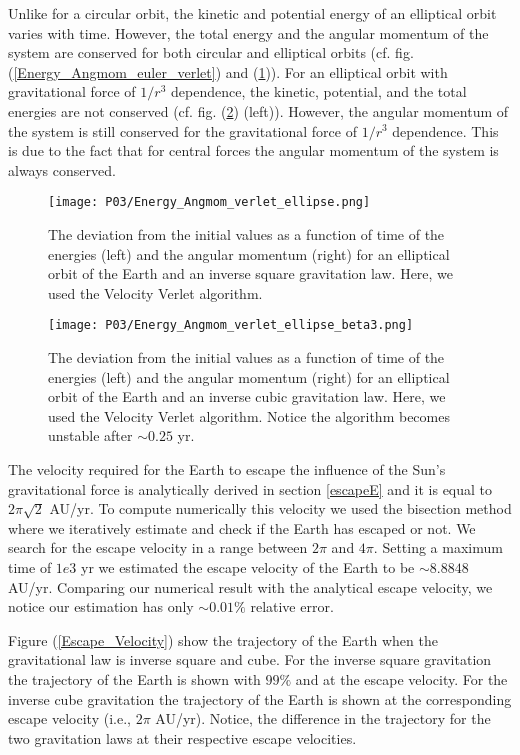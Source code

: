 \documentclass[a4paper]{article}
\begin{document}
Unlike for a circular orbit, the kinetic and potential energy of an elliptical orbit varies with time. However, the total energy and the angular momentum of the system are conserved for both circular and elliptical orbits (cf. fig. (\ref{Energy_Angmom_euler_verlet}) and (\ref{Energy_Angmom_verlet_ellipse})). For an elliptical orbit with gravitational force of $1/r^{3}$ dependence, the kinetic, potential, and the total energies are not conserved (cf. fig. (\ref{Energy_Angmom_verlet_ellipse_beta3}) (left)). However, the angular momentum of the system is still conserved for the gravitational force of $1/r^{3}$ dependence. This is due to the fact that for central forces the angular momentum of the system is always conserved.

\begin{figure}[H]
  \centering
  \texttt{[image: P03/Energy\_Angmom\_verlet\_ellipse.png]}
  \caption{The deviation from the initial values as a function of time of the energies (left) and the angular momentum (right) for an elliptical orbit of the Earth and an inverse square gravitation law. Here, we used the Velocity Verlet algorithm.}
   \label{Energy_Angmom_verlet_ellipse}
\end{figure}
\begin{figure}[H]
  \centering
  \texttt{[image: P03/Energy\_Angmom\_verlet\_ellipse\_beta3.png]}
  \caption{The deviation from the initial values as a function of time of the energies (left) and the angular momentum (right)  for an elliptical orbit of the Earth and an inverse cubic gravitation law. Here, we used the Velocity Verlet algorithm. Notice the algorithm becomes unstable after $\sim 0.25$ yr.}
   \label{Energy_Angmom_verlet_ellipse_beta3}
\end{figure}

The velocity required for the Earth to escape the influence of the Sun's gravitational force is analytically derived in section \ref{escapeE} and it is equal to $2\pi\sqrt{2}$ AU/yr. To compute numerically this velocity we used the bisection method \cite{giordano} where we iteratively estimate and check if the Earth has escaped or not. We search for the escape velocity in a range between $2\pi$ and $4\pi$. Setting a maximum time of $1e3$ yr we estimated the escape velocity of the Earth to be $\sim 8.8848$ AU/yr. Comparing our numerical result with the analytical escape velocity, we notice our estimation has only $\sim 0.01\%$ relative error. 

Figure (\ref{Escape_Velocity}) show the trajectory of the Earth when the gravitational law is inverse square and cube. For the inverse square gravitation the trajectory of the Earth is shown with $99\%$ and at the escape velocity. For the inverse cube gravitation the trajectory of the Earth is shown at the corresponding escape velocity (i.e., $2\pi$ AU/yr). Notice, the difference in the trajectory for the two gravitation laws at their respective escape velocities.
\end{document}
